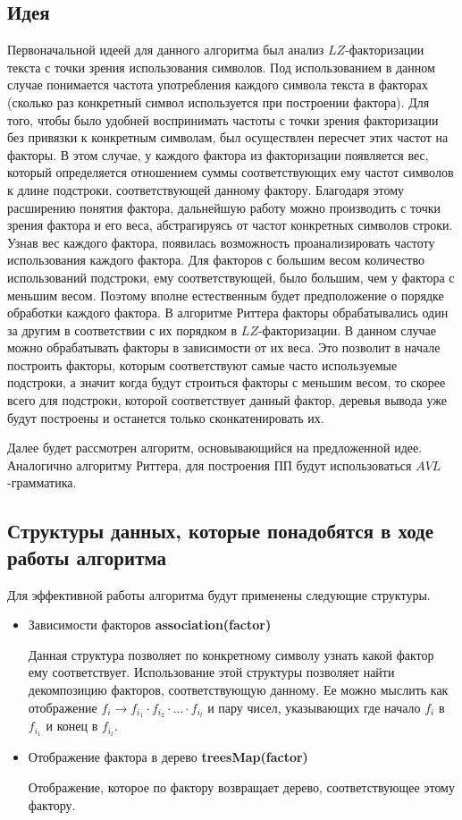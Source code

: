 \documentclass[12pt,a4paper]{extarticle}
\theoremstyle{break}
\begin{document}
\subsection{Идея}
Первоначальной идеей для данного алгоритма был анализ $LZ$-факторизации
текста с точки зрения использования символов. Под использованием в данном случае
понимается частота употребления каждого символа текста в факторах (сколько раз
конкретный символ используется при построении фактора). Для того, чтобы было
удобней воспринимать частоты с точки зрения факторизации без привязки к
конкретным символам, был осуществлен пересчет этих частот на факторы. В этом
случае, у каждого фактора из факторизации появляется вес, который определяется
отношением суммы соответствующих ему частот символов к длине подстроки,
соответствующей данному фактору.
Благодаря этому расширению понятия фактора, дальнейшую работу можно производить с точки
зрения фактора и его веса, абстрагируясь от частот конкретных символов строки.
Узнав вес каждого фактора, появилась возможность проанализировать частоту
использования каждого фактора. Для факторов с большим весом
количество использований подстроки, ему соответствующей, было большим, чем у фактора с
меньшим весом. Поэтому вполне естественным будет предположение о
порядке обработки каждого фактора. В алгоритме Риттера факторы обрабатывались
один за другим в соответствии с их порядком в $LZ$-факторизации. В данном случае
можно обрабатывать факторы в зависимости от их веса. Это позволит в начале
построить факторы, которым соответствуют самые часто используемые
подстроки, а значит когда будут строиться факторы с меньшим весом, то скорее
всего для подстроки, которой соответствует данный фактор, деревья вывода уже
будут построены и останется только сконкатенировать их. 

Далее будет рассмотрен алгоритм, основывающийся на предложенной идее.
Аналогично алгоритму Риттера, для построения ПП будут использоваться
$AVL$-грамматика.

\subsection{Структуры данных, которые понадобятся в ходе работы алгоритма}

Для эффективной работы алгоритма будут применены следующие структуры.

\begin{itemize}
\item Зависимости факторов \textbf{association(factor)}

Данная структура позволяет по конкретному символу узнать какой фактор ему
соответствует. Использование этой структуры позволяет найти декомпозицию
факторов, соответствующую данному. Ее можно мыслить как отображение \emph{$f_i
\rightarrow f_{i_1} \cdot f_{i_2} \cdot \ldots \cdot f_{i_l}$} и пару чисел,
указывающих где начало \emph{$f_i$} в \emph{$f_{i_1}$} и конец в \emph{$f_{i_l}$}. 

\item Отображение фактора в дерево \textbf{treesMap(factor)}

Отображение, которое по фактору возвращает дерево, соответствующее этому
фактору. 
\end{itemize}
\end{document}
